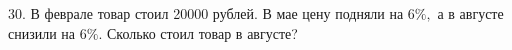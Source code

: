 30. В феврале товар стоил 20000 рублей. В мае цену подняли на $6\%,$ а в августе снизили
на $6\%.$ Сколько стоил товар в августе?\\
